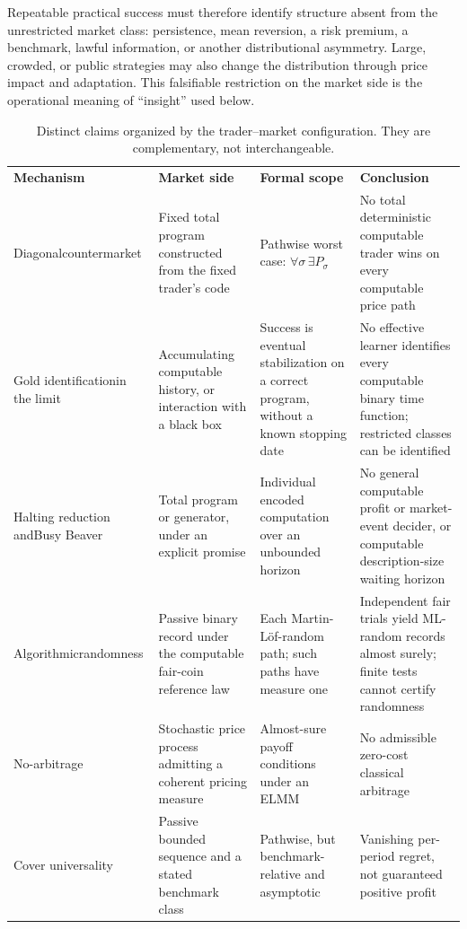 \documentclass[aps,pra,reprint,superscriptaddress,amsmath,amssymb,floatfix]{revtex4-2}
\theoremstyle{plain}
\theoremstyle{definition}
\theoremstyle{remark}
\begin{document}
Repeatable practical success must therefore identify structure absent from the
unrestricted market class: persistence, mean reversion, a risk premium, a
benchmark, lawful information, or another distributional asymmetry. Large,
crowded, or public strategies may also change the distribution through price
impact and adaptation. This falsifiable restriction on the market side is the
operational meaning of ``insight'' used below.

\begin{table}[t]
\caption{\label{tab:claimmap}Distinct claims organized by the trader--market
configuration. They are complementary, not interchangeable.}
\centering
\begin{ruledtabular}
\begin{tabular}{p{}p{}p{}p{}}
\textbf{Mechanism} & \textbf{Market side} & \textbf{Formal scope}
& \textbf{Conclusion} \\
\colrule
Diagonal\newline\mbox{countermarket}
& Fixed total program constructed from the fixed trader's code
& Pathwise worst case:
\(\forall\sigma\,\exists P_\sigma\)
& No total deterministic computable trader wins on every computable price path \\
Gold identification\newline in the limit
& Accumulating computable history, or interaction with a black box
& Success is eventual stabilization on a correct program, without a known
stopping date
& No effective learner identifies every computable binary time function;
restricted classes can be identified \\
Halting reduction and\newline Busy Beaver
& Total program or generator, under an explicit promise
& Individual encoded computation over an unbounded horizon
& No general computable profit or market-event decider, or computable
description-size waiting horizon \\
Algorithmic\newline randomness
& Passive binary record under the computable fair-coin reference law
& Each Martin-L\"of-random path; such paths have measure one
& Independent fair trials yield ML-random records almost surely; finite
tests cannot certify randomness \\
No-arbitrage
& Stochastic price process admitting a coherent pricing measure
& Almost-sure payoff conditions under an ELMM
& No admissible zero-cost classical arbitrage \\
Cover universality
& Passive bounded sequence and a stated benchmark class
& Pathwise, but benchmark-relative and asymptotic
& Vanishing per-period regret, not guaranteed positive profit \\
\end{tabular}
\end{ruledtabular}
\end{table}
\end{document}
